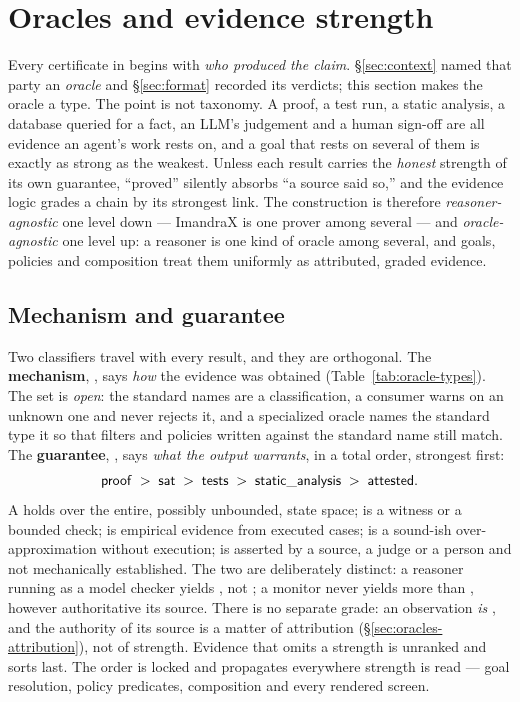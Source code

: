 \section{Oracles and evidence strength}\label{sec:oracles}

Every certificate in \trace{} begins with \emph{who produced the claim}. \S\ref{sec:context} named that party
an \emph{oracle} and \S\ref{sec:format} recorded its verdicts; this section makes the oracle a type. The
point is not taxonomy. A proof, a test run, a static analysis, a database queried for a fact, an LLM's
judgement and a human sign-off are all evidence an agent's work rests on, and a goal that rests on several
of them is exactly as strong as the weakest. Unless each result carries the \emph{honest} strength of its own
guarantee, ``proved'' silently absorbs ``a source said so,'' and the evidence logic grades a chain by its
strongest link. The construction is therefore \emph{reasoner-agnostic} one level down --- ImandraX is one
prover among several --- and \emph{oracle-agnostic} one level up: a reasoner is one kind of oracle among
several, and goals, policies and composition treat them uniformly as attributed, graded evidence.

\subsection{Mechanism and guarantee}\label{sec:oracles-type}

Two classifiers travel with every result, and they are orthogonal. The \textbf{mechanism},
, says \emph{how} the evidence was obtained (Table~\ref{tab:oracle-types}). The set is
\emph{open}: the standard names are a classification, a consumer warns on an unknown one and never rejects
it, and a specialized oracle names the standard type it  so that filters and policies
written against the standard name still match. The \textbf{guarantee}, , says
\emph{what the output warrants}, in a total order, strongest first:
\[
\mathsf{proof} \;>\; \mathsf{sat} \;>\; \mathsf{tests} \;>\; \mathsf{static\_analysis} \;>\; \mathsf{attested}.
\]
A  holds over the entire, possibly unbounded, state space;  is a witness or a bounded
check;  is empirical evidence from executed cases;  is a sound-ish
over-approximation without execution;  is asserted by a source, a judge or a person and not
mechanically established. The two are deliberately distinct: a reasoner running as a model checker yields
, not ; a monitor never yields more than , however authoritative its
source. There is no separate  grade: an observation \emph{is} , and the
authority of its source is a matter of attribution (\S\ref{sec:oracles-attribution}), not of strength.
Evidence that omits a strength is unranked and sorts last. The order is locked and propagates everywhere
strength is read --- goal resolution, policy predicates, composition and every rendered screen.

